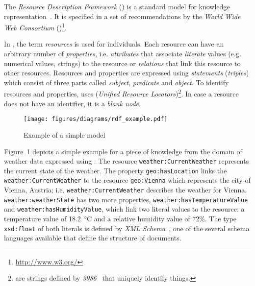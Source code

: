 The \emph{Resource Description Framework} () is a standard model for knowledge representation~\cite{RDF}. It is specified in a set of recommendations by the \emph{World Wide Web Consortium} ()\footnote{\href{http://www.w3.org/}{http://www.w3.org/}}.

In , the term \emph{resources} is used for individuals. Each resource can have an arbitrary number of \emph{properties}, i.e. \emph{attributes} that associate \emph{literate} values (e.g. numerical values, strings) to the resource or \emph{relations} that link this resource to other resources. Resources and properties are expressed using \emph{statements} (\emph{triples}) which consist of three parts called \emph{subject}, \emph{predicate} and \emph{object}. To identify resources and properties,  uses  (\emph{Unified Resource Locators})\footnote{ are strings defined by \emph{ 3986}~\cite{rfc3986} that uniquely identify things.}. In case a resource does not have an identifier, it is a \emph{blank node}.

\begin{figure}
\centering
\texttt{[image: figures/diagrams/rdf\_example.pdf]}
\caption{Example of a simple  model}
\label{fig:rdf_example}
\end{figure}

Figure~\ref{fig:rdf_example} depicts a simple example for a piece of knowledge from the domain of weather data expressed using : The resource \texttt{weather:\hspace{0pt}Current\hspace{0pt}Weather} represents the current state of the weather. The property \texttt{geo:\hspace{0pt}has\hspace{0pt}Location} links the \texttt{weather:\hspace{0pt}Current\hspace{0pt}Weather} to the resource \texttt{geo:\hspace{0pt}Vienna} which represents the city of Vienna, Austria; i.e. \texttt{weather:\hspace{0pt}Current\hspace{0pt}Weather} describes the weather for Vienna. \texttt{weather:\hspace{0pt}weather\hspace{0pt}State} has two more properties, \texttt{weather:\hspace{0pt}has\hspace{0pt}Temperature\hspace{0pt}Value} and \texttt{weather:\hspace{0pt}has\hspace{0pt}Humidity\hspace{0pt}Value}, which link two literal values to the resource: a temperature value of \SI{18.2}{\celsius} and a relative humidity value of $72 \%$.
The type \texttt{xsd:\hspace{0pt}float} of both literals is defined by \emph{XML Schema}~\cite{xml-schema,xml-schema-datatypes}, one of the several  schema languages available that define the structure of  documents.

